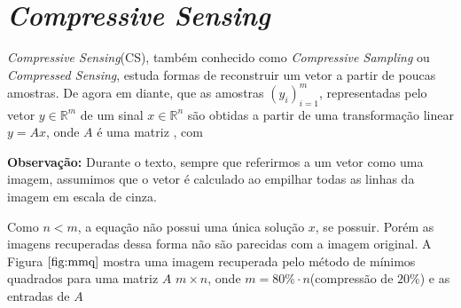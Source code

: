 \chapter{\textit{Compressive Sensing}}

\textit{Compressive Sensing}(CS), também conhecido como \textit{Compressive Sampling} ou \textit{Compressed Sensing},  estuda formas de reconstruir um vetor a partir de poucas amostras. De agora em diante,   que as amostras $(y_i)_{i = 1}^m$, representadas pelo vetor $y \in \mathbb{R}^m$ de um sinal $x \in \mathbb{R}^n$ são obtidas a partir de uma transformação linear $y = Ax$, onde $A$ é uma matriz , com 

{\bf Observação:} Durante o texto, sempre que referirmos a um vetor como uma imagem, assumimos que o vetor é calculado ao empilhar todas as linhas da imagem em escala de cinza.

Como $n < m$, a equação não possui uma única solução $x$, se possuir.  Porém as imagens recuperadas dessa forma não são parecidas com a imagem original. A Figura $\ref{fig:mmq}$ mostra uma imagem recuperada pelo método de mínimos quadrados para uma matriz $A$ $m \times n$, onde $m = 80 \% \cdot n$(compressão de $20\%$) e as entradas de $A$ 

